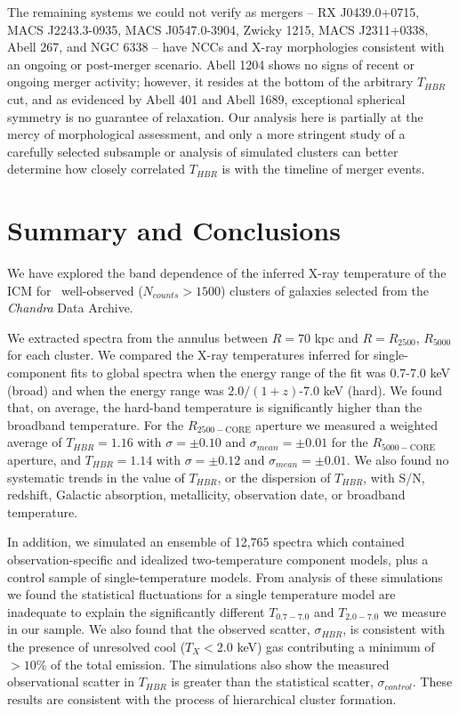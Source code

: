 The remaining systems we could not verify as mergers -- RX
J0439.0+0715, MACS J2243.3-0935, MACS J0547.0-3904, Zwicky 1215, MACS
J2311+0338, Abell 267, and NGC 6338 -- have NCCs and X-ray
morphologies consistent with an ongoing or post-merger scenario. Abell
1204 shows no signs of recent or ongoing merger activity; however, it
resides at the bottom of the arbitrary $T_{HBR}$ cut, and as evidenced
by Abell 401 and Abell 1689, exceptional spherical symmetry is no
guarantee of relaxation. Our analysis here is partially at the mercy
of morphological assessment, and only a more stringent study of a
carefully selected subsample or analysis of simulated clusters can
better determine how closely correlated $T_{HBR}$ is with the timeline
of merger events.

\section{Summary and Conclusions}
\label{sec:ebandsummary}

We have explored the band dependence of the inferred X-ray temperature
of the ICM for \ebandnumb\ well-observed ($N_{counts} > 1500$) clusters
of galaxies selected from the {\it Chandra} Data Archive.

We extracted spectra from the annulus between $R=70$ kpc and
$R=R_{2500}$, $R_{5000}$ for each cluster. We compared the X-ray
temperatures inferred for single-component fits to global spectra when
the energy range of the fit was 0.7-7.0 keV (broad) and when the
energy range was $2.0/(1+z)$-7.0 keV (hard). We found that, on
average, the hard-band temperature is significantly higher than the
broadband temperature. For the $R_{2500-\mathrm{CORE}}$ aperture we
measured a weighted average of $T_{HBR} = 1.16$ with $\sigma = \pm
0.10$ and $\sigma_{mean} = \pm 0.01$ for the $R_{5000-\mathrm{CORE}}$
aperture, and $T_{HBR} = 1.14$ with $\sigma = \pm 0.12$ and
$\sigma_{mean} = \pm 0.01$. We also found no systematic trends in the
value of $T_{HBR}$, or the dispersion of $T_{HBR}$, with S/N,
redshift, Galactic absorption, metallicity, observation date, or
broadband temperature.

In addition, we simulated an ensemble of 12,765 spectra which
contained observation-specific and idealized two-temperature component
models, plus a control sample of single-temperature models. From
analysis of these simulations we found the statistical fluctuations
for a single temperature model are inadequate to explain the
significantly different $T_{0.7-7.0}$ and $T_{2.0-7.0}$ we measure in
our sample. We also found that the observed scatter, $\sigma_{HBR}$,
is consistent with the presence of unresolved cool ($T_X < 2.0$ keV)
gas contributing a minimum of $>10\%$ of the total emission. The
simulations also show the measured observational scatter in $T_{HBR}$
is greater than the statistical scatter, $\sigma_{control}$. These
results are consistent with the process of hierarchical cluster
formation.

